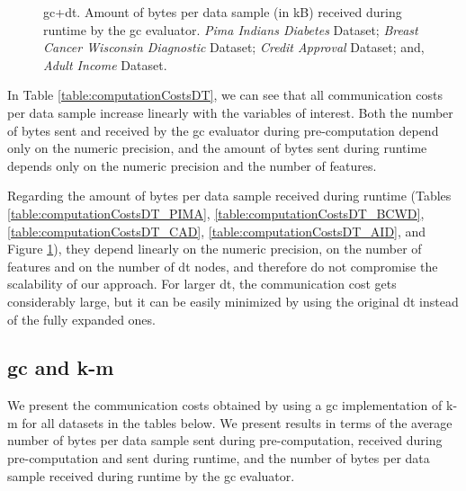\begin{figure}[hpt]
\caption[\acs{gc}+\acs{dt}. Amount of bytes per data sample (in kB) received during runtime by the \ac{gc} evaluator. All datasets.]{\acs{gc}+\acs{dt}. Amount of bytes per data sample (in kB) received during runtime by the \ac{gc} evaluator.
 \emph{Pima Indians Diabetes} Dataset;
 \emph{Breast Cancer Wisconsin Diagnostic} Dataset;
 \emph{Credit Approval} Dataset; and,
 \emph{Adult Income} Dataset.}%
\label{fig:dt-gc-comm}%
\end{figure}

In Table \ref{table:computationCostsDT}, we can see that all communication costs per data sample increase linearly with the variables of interest. Both the number of bytes sent and received by the \ac{gc} evaluator during pre-computation depend only on the numeric precision, and the amount of bytes sent during runtime depends only on the numeric precision and the number of features.

Regarding the amount of bytes per data sample received during runtime (Tables \ref{table:computationCostsDT_PIMA}, \ref{table:computationCostsDT_BCWD}, \ref{table:computationCostsDT_CAD}, \ref{table:computationCostsDT_AID}, and Figure \ref{fig:dt-gc-comm}), they depend linearly on the numeric precision, on the number of features and on the number of \ac{dt} nodes, and therefore do not compromise the scalability of our approach. For larger \ac{dt}, the communication cost gets considerably large, but it can be easily minimized by using the original \ac{dt} instead of the fully expanded ones.




\subsection{\acl{gc} and \acl{k-m}}

We present the communication costs obtained by using a \ac{gc} implementation of \ac{k-m} for all datasets in the tables below. We present results in terms of the average number of bytes per data sample sent during pre-computation, received during pre-computation and sent during runtime, and the number of bytes per data sample received during runtime by the \ac{gc} evaluator. 


